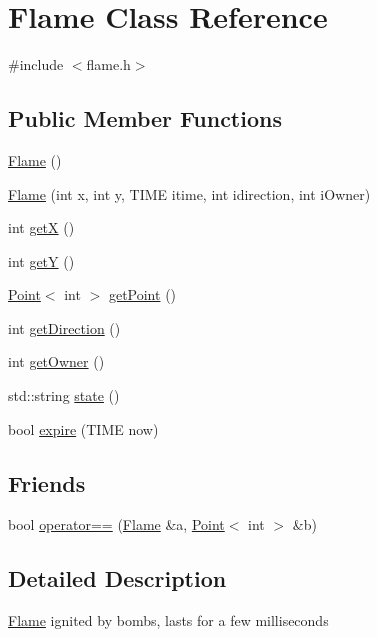 \hypertarget{class_flame}{\section{Flame Class Reference}
\label{class_flame}
}


{\ttfamily \#include $<$flame.\-h$>$}

\subsection*{Public Member Functions}
\begin{DoxyCompactItemize}
\item 
\hyperlink{class_flame_a57b7b3fa89daf6286b205747f0d48489}{Flame} ()
\item 
\hyperlink{class_flame_adc784ed93fe91e8917d7f4e7cd9562e2}{Flame} (int x, int y, T\-I\-M\-E itime, int idirection, int i\-Owner)
\item 
int \hyperlink{class_flame_acaae0ee856fb9053ce7e8b382b995b40}{get\-X} ()
\item 
int \hyperlink{class_flame_a8233ffdd2d353d06e3e959c1cf88f892}{get\-Y} ()
\item 
\hyperlink{class_point}{Point}$<$ int $>$ \hyperlink{class_flame_adcdcca15ef648dd565bce250136b2504}{get\-Point} ()
\item 
int \hyperlink{class_flame_a4aa12557641e6153ba4549d33aa26f69}{get\-Direction} ()
\item 
int \hyperlink{class_flame_aa5f15b836fc3b3876f8bf37b9c402fb4}{get\-Owner} ()
\item 
std\-::string \hyperlink{class_flame_a8528151fe91174b1f678cf4be16a3142}{state} ()
\item 
bool \hyperlink{class_flame_afafbec6ce7f0dbd966faf4a833df4946}{expire} (T\-I\-M\-E now)
\end{DoxyCompactItemize}
\subsection*{Friends}
\begin{DoxyCompactItemize}
\item 
bool \hyperlink{class_flame_a878ec21744cb98bc2d694f698602b9e5}{operator==} (\hyperlink{class_flame}{Flame} \&a, \hyperlink{class_point}{Point}$<$ int $>$ \&b)
\end{DoxyCompactItemize}


\subsection{Detailed Description}
\hyperlink{class_flame}{Flame} ignited by bombs, lasts for a few milliseconds 

